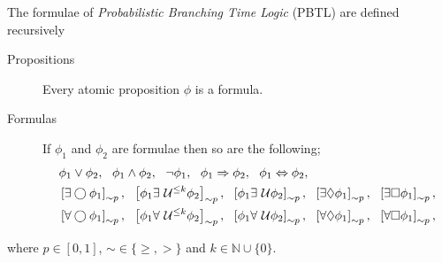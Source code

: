 \begin{defi}[PBTL]
The formulae of \emph{Probabilistic Branching Time Logic} (PBTL) are defined recursively
\begin{description}
    \item[Propositions]{Every atomic proposition $\phi$ is a formula.}
    \item[Formulas]{If $\phi_{1}$ and $\phi_{2}$ are formulae then so are the following;
    \begin{align*}
        & \phi_{1} \lor \phi_{2},\ \ \phi_{1} \land \phi_{2}, \ \ \lnot \phi_{1}, \ \ \phi_{1} \Rightarrow \phi_{2},\ \ \phi_{1} \Leftrightarrow \phi_{2}, \\
        & \left[\exists\bigcirc \phi_{1}\right]_{\sim p}, \ \
          \left[\phi_{1} \exists\until^{\leq k} \phi_{2}\right]_{\sim p}, \ \
          \left[\phi_{1} \exists\until \phi_{2}\right]_{\sim p}, \ \
          \left[\exists\lozenge \phi_{1}\right]_{\sim p}, \ \
          \left[\exists\square \phi_{1}\right]_{\sim p}, \\
        & \left[\forall\bigcirc \phi_{1}\right]_{\sim p}, \ \
          \left[\phi_{1} \forall\until^{\leq k} \phi_{2}\right]_{\sim p}, \ \
          \left[\phi_{1} \forall\until \phi_{2}\right]_{\sim p}, \ \
          \left[\forall\lozenge \phi_{1}\right]_{\sim p}, \ \
          \left[\forall\square \phi_{1}\right]_{\sim p},
        \end{align*}}
\end{description}
where $p\in[0,1]$, $\sim\in\{\geq,>\}$ and $k\in\mathbb{N}\cup\{0\}$.
\end{defi}

